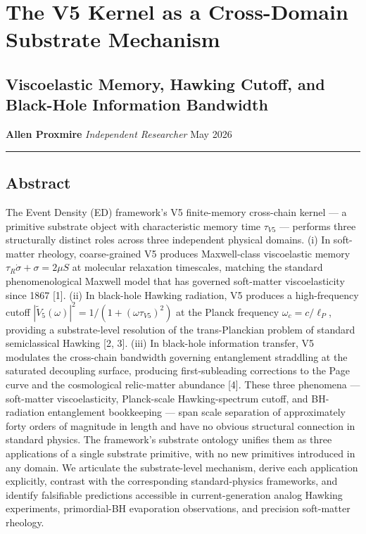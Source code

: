 \documentclass[
  11pt,
  a4paperpaper,
]{article}
\author{}
\date{}
\begin{document}
\section{The V5 Kernel as a Cross-Domain Substrate
Mechanism}\label{the-v5-kernel-as-a-cross-domain-substrate-mechanism}

\subsection{Viscoelastic Memory, Hawking Cutoff, and Black-Hole
Information
Bandwidth}\label{viscoelastic-memory-hawking-cutoff-and-black-hole-information-bandwidth}

\textbf{Allen Proxmire} \emph{Independent Researcher} May 2026

\begin{center}\rule{0.5\linewidth}{0.5pt}\end{center}

\subsection{Abstract}\label{abstract}

The Event Density (ED) framework's V5 finite-memory cross-chain kernel
--- a primitive substrate object with characteristic memory time
\(\tau_{V5}\) --- performs three structurally distinct roles across
three independent physical domains. (i) In soft-matter rheology,
coarse-grained V5 produces Maxwell-class viscoelastic memory
\(\tau_R \dot\sigma + \sigma = 2\mu S\) at molecular relaxation
timescales, matching the standard phenomenological Maxwell model that
has governed soft-matter viscoelasticity since 1867 {[}1{]}. (ii) In
black-hole Hawking radiation, V5 produces a high-frequency cutoff
\(|\tilde V_5(\omega)|^2 = 1/(1+(\omega\tau_{V5})^2)\) at the Planck
frequency \(\omega_c = c/\ell_P\), providing a substrate-level
resolution of the trans-Planckian problem of standard semiclassical
Hawking {[}2, 3{]}. (iii) In black-hole information transfer, V5
modulates the cross-chain bandwidth governing entanglement straddling at
the saturated decoupling surface, producing first-subleading corrections
to the Page curve and the cosmological relic-matter abundance {[}4{]}.
These three phenomena --- soft-matter viscoelasticity, Planck-scale
Hawking-spectrum cutoff, and BH-radiation entanglement bookkeeping ---
span scale separation of approximately forty orders of magnitude in
length and have no obvious structural connection in standard physics.
The framework's substrate ontology unifies them as three applications of
a single substrate primitive, with no new primitives introduced in any
domain. We articulate the substrate-level mechanism, derive each
application explicitly, contrast with the corresponding standard-physics
frameworks, and identify falsifiable predictions accessible in
current-generation analog Hawking experiments, primordial-BH evaporation
observations, and precision soft-matter rheology.
\end{document}

